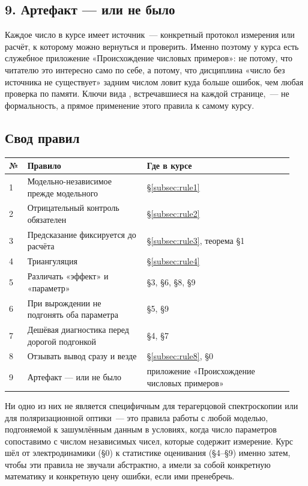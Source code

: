 \subsection{9. Артефакт — или не было}
\label{subsec:rule9}

Каждое число в курсе имеет источник~--- конкретный протокол измерения или расчёт, к которому
можно вернуться и проверить. Именно поэтому у курса есть служебное приложение
«Происхождение числовых примеров»: не потому, что читателю это интересно само по себе, а потому,
что дисциплина «число без источника не существует» задним числом ловит куда больше ошибок, чем
любая проверка по памяти. Ключи вида , встречавшиеся на каждой странице,~---
не формальность, а прямое применение этого правила к самому курсу.

\subsection{Свод правил}

\begin{center}
\footnotesize
\setlength{\tabcolsep}{6pt}
\begin{tabular}{@{}p{0.05\linewidth}p{0.40\linewidth}p{0.49\linewidth}@{}}
\toprule
\textbf{№} & \textbf{Правило} & \textbf{Где в курсе} \\
\midrule
1 & Модельно-независимое прежде модельного & §\ref{subsec:rule1} \\
2 & Отрицательный контроль обязателен & §\ref{subsec:rule2} \\
3 & Предсказание фиксируется до расчёта & §\ref{subsec:rule3}, теорема §1 \\
4 & Триангуляция & §\ref{subsec:rule4} \\
5 & Различать «эффект» и «параметр» & §3, §6, §8, §9 \\
6 & При вырождении не подгонять оба параметра & §5, §9 \\
7 & Дешёвая диагностика перед дорогой подгонкой & §4, §7 \\
8 & Отзывать вывод сразу и везде & §\ref{subsec:rule8}, §0 \\
9 & Артефакт — или не было & приложение «Происхождение числовых примеров» \\
\bottomrule
\end{tabular}
\end{center}

\begin{intuition}
Ни одно из них не является специфичным для терагерцовой спектроскопии или для поляризационной
оптики~--- это правила работы с любой моделью, подгоняемой к зашумлённым данным в условиях, когда
число параметров сопоставимо с числом независимых чисел, которые содержит измерение. Курс шёл от
электродинамики (§0) к статистике оценивания (§4--§9) именно затем, чтобы эти правила не звучали
абстрактно, а имели за собой конкретную математику и конкретную цену ошибки, если ими пренебречь.
\end{intuition}

\clearpage
